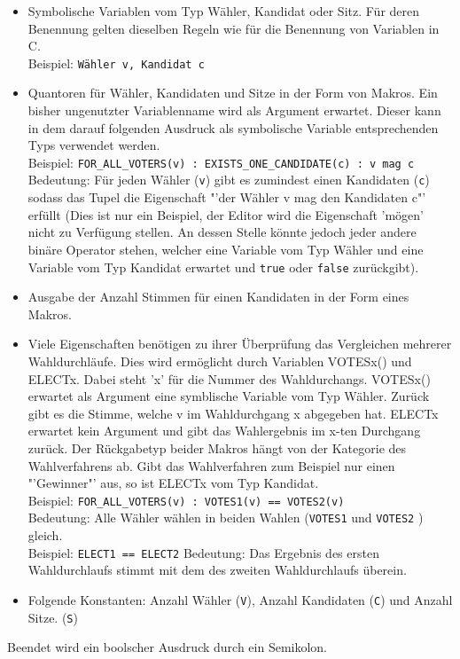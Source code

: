 \documentclass[a4paper]{scrreprt}
\begin{document}
\begin{itemize}
\item Symbolische Variablen vom Typ Wähler, Kandidat oder Sitz. Für deren Benennung gelten dieselben Regeln wie für die Benennung von Variablen in C. \\

Beispiel: \verb!Wähler v, Kandidat c!

\item Quantoren für Wähler, Kandidaten und Sitze in der Form von \gls{Makro}s. Ein bisher ungenutzter Variablenname wird als Argument erwartet. Dieser kann in dem darauf folgenden Ausdruck als symbolische Variable entsprechenden Typs verwendet werden. \\

Beispiel: \verb|FOR_ALL_VOTERS(v) : EXISTS_ONE_CANDIDATE(c) : v mag c| \\
Bedeutung: Für jeden Wähler (\verb!v!) gibt es zumindest einen Kandidaten (\verb!c!) sodass das Tupel die Eigenschaft "'der Wähler v mag den Kandidaten c"' erfüllt (Dies ist nur ein Beispiel, der Editor wird die Eigenschaft 'mögen' nicht zu Verfügung stellen. An dessen Stelle könnte jedoch jeder andere binäre Operator stehen, welcher eine Variable vom Typ Wähler und eine Variable vom Typ Kandidat erwartet und \texttt{true} oder \texttt{false} zurückgibt).

\item Ausgabe der Anzahl Stimmen für einen Kandidaten in der Form eines Makros.

\item Viele Eigenschaften benötigen zu ihrer Überprüfung das Vergleichen mehrerer Wahldurchläufe. Dies wird ermöglicht durch Variablen VOTESx() und ELECTx. Dabei steht 'x' für die Nummer des Wahldurchangs. VOTESx() erwartet als Argument eine symblische Variable vom Typ Wähler. Zurück gibt es die Stimme, welche v im Wahldurchgang x abgegeben hat. ELECTx erwartet kein Argument und gibt das Wahlergebnis im x-ten Durchgang zurück. Der Rückgabetyp beider Makros hängt von der Kategorie des Wahlverfahrens ab. Gibt das Wahlverfahren zum Beispiel nur einen "'Gewinner"' aus, so ist ELECTx vom Typ Kandidat. \\

Beispiel: \verb|FOR_ALL_VOTERS(v) : VOTES1(v) == VOTES2(v)| \\
Bedeutung: Alle Wähler wählen in beiden Wahlen (\verb!VOTES1! und \verb!VOTES2! ) gleich. \\

Beispiel: \verb|ELECT1 == ELECT2|
Bedeutung: Das Ergebnis des ersten Wahldurchlaufs stimmt mit dem des zweiten Wahldurchlaufs überein.
\item Folgende Konstanten: Anzahl Wähler (\verb!V!), Anzahl Kandidaten (\verb!C!) und Anzahl Sitze. (\verb!S!)
\end{itemize}
Beendet wird ein boolscher Ausdruck durch ein Semikolon. 
\end{document}
